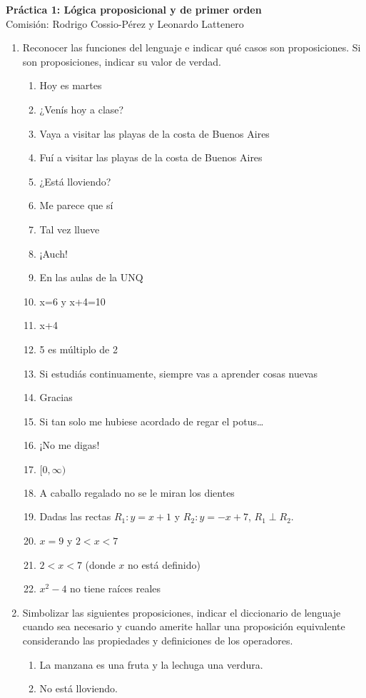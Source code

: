 \documentclass[a4paper]{article}
\newcommand{\Item}{\item[\stepcounter{enumii}$\blacktriangleright$\textbf{(\alph{enumii})}]} %
\newcommand{\exercise}{\item}
\begin{document}
\noindent \hrulefill 
\vspace{-7pt}
\begin{center} 
	\textbf{ Práctica 1: Lógica proposicional y de primer orden } \\
	Comisión: Rodrigo Cossio-Pérez y Leonardo Lattenero
\end{center}
\vspace{-10pt}
\hrulefill
\begin{enumerate}
	\exercise Reconocer las funciones del lenguaje e indicar qué casos son proposiciones. Si son proposiciones, indicar su valor de verdad.
	\begin{multicols}{2}
	\begin{enumerate} [label=(\alph*)]
		\Item Hoy es martes 
		\item ¿Venís hoy a clase?
		\Item Vaya a visitar las playas de la costa de Buenos Aires
		\item Fuí a visitar las playas de la costa de Buenos Aires 
		\Item ¿Está lloviendo?
		\Item Me parece que sí 
		\item Tal vez llueve
		\item ¡Auch!
		\Item En las aulas de la UNQ
		\Item x=6 y x+4=10 
		\Item x+4 
		\item 5 es múltiplo de 2 
		\item Si estudiás continuamente, siempre vas a aprender cosas nuevas 
		\item Gracias
		\Item Si tan solo me hubiese acordado de regar el potus…
		\item ¡No me digas!
		\item $ [ 0, \infty )$
		\Item A caballo regalado no se le miran los dientes 
		\Item Dadas las rectas $R_1: y=x+1$ y $R_2: y=-x+7$, $R_1 \perp R_2$.
		\item $x=9$ y $2 < x < 7$
		\item $2 < x < 7$ (donde $x$ no está definido)
		\Item $x^2-4$ no tiene raíces reales 
	\end{enumerate}
	\end{multicols}
	\exercise Simbolizar las siguientes proposiciones, indicar el diccionario de lenguaje cuando sea necesario y cuando amerite hallar una proposición equivalente considerando las propiedades y definiciones de los operadores.
	\begin{multicols}{2}
	\begin{enumerate} [label=(\alph*)]
		\item La manzana es una fruta y la lechuga una verdura. 
		\item No está lloviendo. 

\end{enumerate}
\end{multicols}
\end{enumerate}
\end{document}
